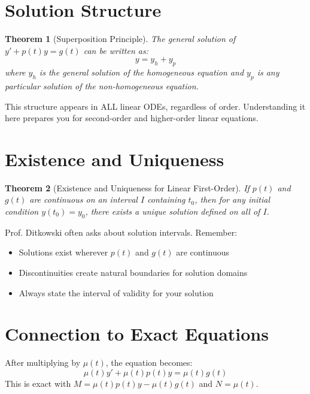 \documentclass[12pt]{article}
\newtheorem{theorem}{Theorem}
\begin{document}
\section{Solution Structure}

\begin{theorem}[Superposition Principle]
The general solution of $y' + p(t)y = g(t)$ can be written as:
\[y = y_h + y_p\]
where $y_h$ is the general solution of the homogeneous equation and $y_p$ is any particular solution of the non-homogeneous equation.
\end{theorem}

\begin{insight}
This structure appears in ALL linear ODEs, regardless of order. Understanding it here prepares you for second-order and higher-order linear equations.
\end{insight}

\section{Existence and Uniqueness}

\begin{theorem}[Existence and Uniqueness for Linear First-Order]
If $p(t)$ and $g(t)$ are continuous on an interval $I$ containing $t_0$, then for any initial condition $y(t_0) = y_0$, there exists a unique solution defined on all of $I$.
\end{theorem}

\begin{examtip}
Prof. Ditkowski often asks about solution intervals. Remember:
\begin{itemize}
\item Solutions exist wherever $p(t)$ and $g(t)$ are continuous
\item Discontinuities create natural boundaries for solution domains
\item Always state the interval of validity for your solution
\end{itemize}
\end{examtip}

\section{Connection to Exact Equations}

\begin{keypoint}
After multiplying by $\mu(t)$, the equation becomes:
\[\mu(t)y' + \mu(t)p(t)y = \mu(t)g(t)\]
This is exact with $M = \mu(t)p(t)y - \mu(t)g(t)$ and $N = \mu(t)$.
\end{keypoint}
\end{document}
